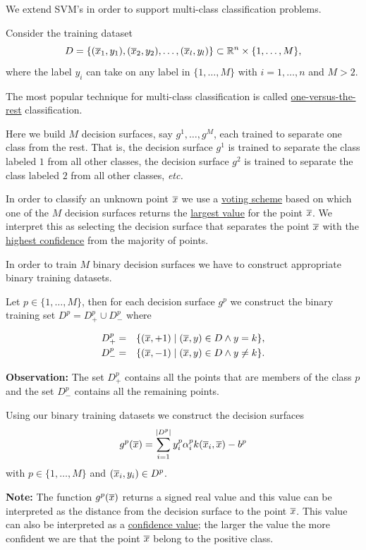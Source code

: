 \documentclass[a4paper,blends,pdf,colorBG,slideColor]{prosper}
\begin{document}

We extend SVM's in order to support multi-class classification problems.

Consider the training dataset
\[
D = \{(\overline{x}_1,y_1), (\overline{x}_2,y_2),\ldots,(\overline{x}_l,y_l)\} \subset \mathbb{R}^{n} \times \{1,\ldots,M\},
\]
where the label $y_i$ can take on any label in $\{1,\ldots,M\}$ with $i = 1,\ldots,n$ and $M > 2$.

The most popular technique for multi-class classification 
is called \ul{one-versus-the-rest} classification.  

Here we build $M$ decision surfaces, say $g^1,\ldots,g^M$, each trained to separate one
class from the rest.
That is, the decision surface $g^1$ is trained to separate the class labeled $1$ from all other classes,
the decision surface $g^2$ is trained to separate the class labeled $2$ from all other classes, {\it etc.}

In order to classify an unknown point $\overline{x}$ we use a \ul{voting scheme} based
on which one of the $M$ decision surfaces returns the \ul{largest value} for the point $\overline{x}$.
We interpret this as selecting the decision surface that separates the point $\overline{x}$ with the \ul{highest confidence} from the
majority of points.

\es

In order to train $M$ binary
decision surfaces we have to construct appropriate binary training datasets.

Let $p \in \{1,\ldots,M\}$, then for each decision surface $g^p$ we construct the binary training set
$D^p = D_{+}^p \cup D_{-}^p$ where

\begin{eqnarray*}
D_{+}^p &=& \{(\overline{x},+1) \mid (\overline{x},y) \in D \wedge y = k \},\\
D_{-}^p &=& \{(\overline{x},-1) \mid (\overline{x},y) \in D \wedge y \neq k \}.
\end{eqnarray*}

{\bf Observation:} The set $D_{+}^p$ contains all the points that are members of the class $p$ and
the set $D_{-}^p$ contains all the remaining points.
\es

Using our binary training datasets we construct the decision surfaces
\[
g^p(\overline{x}) = \sum_{i=1}^{|{D^p}|} y_i^p\alpha_i^p k(\overline{x}_i,\overline{x}) - b^p
\]
with $p \in \{1,\ldots,M\}$ and $(\overline{x}_i,y_i)\in D^p$.

\vspace{.2in}
{\bf Note:} The function $g^p(\overline{x})$ returns a signed real value and this value
can be interpreted as the distance from the decision surface to the point $\overline{x}$.
This value can also be interpreted as a \ul{confidence value}; the larger the value
the more confident we are that the point $\overline{x}$ belong to the positive class.
\end{document}
